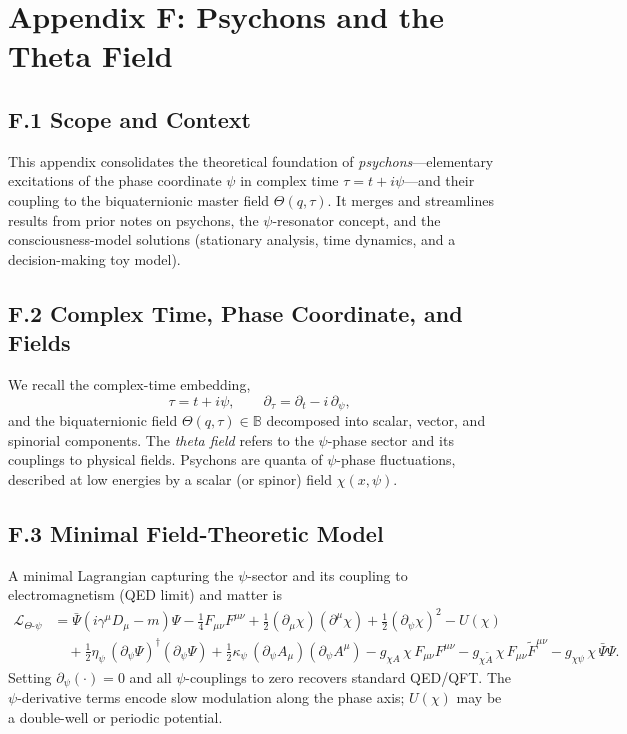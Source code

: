 \appendix
\section*{Appendix F: Psychons and the Theta Field}

\subsection*{F.1 Scope and Context}
This appendix consolidates the theoretical foundation of \emph{psychons}---elementary excitations of the phase coordinate $\psi$ in complex time $\tau=t+i\psi$---and their coupling to the biquaternionic master field $\Theta(q,\tau)$. It merges and streamlines results from prior notes on psychons, the $\psi$-resonator concept, and the consciousness-model solutions (stationary analysis, time dynamics, and a decision-making toy model).

\subsection*{F.2 Complex Time, Phase Coordinate, and Fields}
We recall the complex-time embedding,
\begin{equation}
\tau = t + i\psi,\qquad \partial_\tau = \partial_t - i\,\partial_\psi,
\end{equation}
and the biquaternionic field $\Theta(q,\tau)\in\mathbb{B}$ decomposed into scalar, vector, and spinorial components. The \emph{theta field} refers to the $\psi$-phase sector and its couplings to physical fields. Psychons are quanta of $\psi$-phase fluctuations, described at low energies by a scalar (or spinor) field $\chi(x,\psi)$.

\subsection*{F.3 Minimal Field-Theoretic Model}
A minimal Lagrangian capturing the $\psi$-sector and its coupling to electromagnetism (QED limit) and matter is
\begin{align}
\mathcal{L}_{\Theta\text{-}\psi} &= \bar{\Psi}(i\gamma^\mu D_\mu - m)\Psi - \frac{1}{4}F_{\mu\nu}F^{\mu\nu}
+ \frac{1}{2}(\partial_\mu \chi)(\partial^\mu \chi) + \frac{1}{2}(\partial_\psi \chi)^2 - U(\chi) \nonumber\\
&\quad + \frac{1}{2}\eta_\psi\,(\partial_\psi \Psi)^\dagger(\partial_\psi \Psi)
+ \frac{1}{2}\kappa_\psi\,(\partial_\psi A_\mu)(\partial_\psi A^\mu)
- g_{\chi A}\,\chi\,F_{\mu\nu}F^{\mu\nu}
- g_{\chi \tilde{A}}\,\chi\,F_{\mu\nu}\tilde{F}^{\mu\nu}
- g_{\chi \psi}\,\chi\,\bar{\Psi}\Psi.
\end{align}
Setting $\partial_\psi(\cdot)=0$ and all $\psi$-couplings to zero recovers standard QED/QFT. The $\psi$-derivative terms encode slow modulation along the phase axis; $U(\chi)$ may be a double-well or periodic potential.

